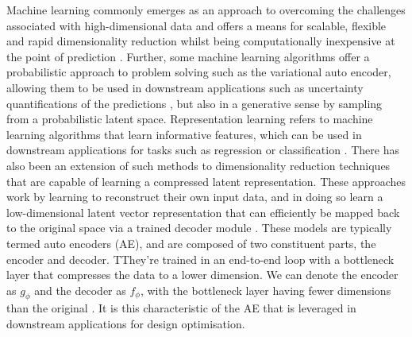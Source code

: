 \documentclass{article}
\begin{document}
Machine learning commonly emerges as an approach to overcoming the challenges associated with high-dimensional data and offers a means for scalable, flexible and rapid dimensionality reduction whilst being computationally inexpensive at the point of prediction \citep{Deshpande2024}. Further, some machine learning algorithms offer a probabilistic approach to problem solving such as the variational auto encoder, allowing them to be used in downstream applications such as uncertainty quantifications of the predictions \citep{Donnelly2024}, but also in a generative sense by sampling from a probabilistic latent space. 
Representation learning refers to machine learning algorithms that learn informative features, which can be used in downstream applications for tasks such as regression or classification \citep{Bengio2012}. There has also been an extension of such methods to dimensionality reduction techniques that are capable of learning a compressed latent representation. These approaches work by learning to reconstruct their own input data, and in doing so learn a low-dimensional latent vector representation that can efficiently be mapped back to the original space via a trained decoder module \citep{Huang2022}. These models are typically termed auto encoders (AE), and are composed of two constituent parts, the encoder and decoder. TThey’re trained in an end-to-end loop with a bottleneck layer that compresses the data to a lower dimension. We can denote the encoder as $g_\phi$ and the decoder as $f_\phi$, with the bottleneck layer having fewer dimensions than the original \citep{DAgostino2018}. It is this characteristic of the AE that is leveraged in downstream applications for design optimisation.
\end{document}
